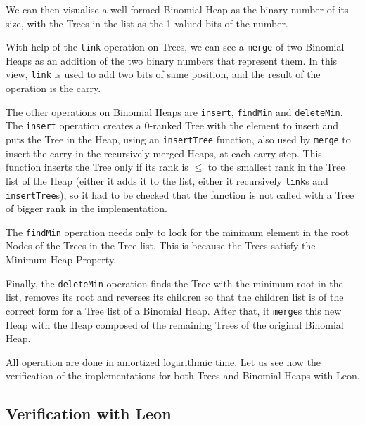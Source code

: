We can then visualise a well-formed Binomial Heap as the binary number of its size, 
with the Trees in the list as the 1-valued bits of the number.

With help of the \verb|link| operation on Trees, 
we can see a \verb|merge| of two Binomial Heaps 
as an addition of the two binary numbers that represent them.
In this view, \verb|link| is used to add two bits of same position,
and the result of the operation is the carry.

The other operations on Binomial Heaps are \verb|insert|, \verb|findMin| and \verb|deleteMin|. 
The \verb|insert| operation creates a 0-ranked Tree with the element to insert 
and puts the Tree in the Heap, using an \verb|insertTree| function, 
also used by \verb|merge| to insert the carry in the recursively merged Heaps,
at each carry step.
This function inserts the Tree only if its rank is $\leq$ to the smallest rank in the Tree list of the Heap 
(either it adds it to the list, either it recursively \verb|link|s and \verb|insertTree|s),
so it had to be checked that the function is not called with a Tree of bigger rank in the implementation.

The \verb|findMin| operation needs only to look for the minimum element 
in the root Nodes of the Trees in the Tree list.
This is because the Trees satisfy the Minimum Heap Property.

Finally, the \verb|deleteMin| operation finds the Tree with the minimum root in the list,
removes its root 
and reverses its children so that the children list is of the correct form for a Tree list of a Binomial Heap.
After that, it \verb|merge|s this new Heap with the Heap composed of 
the remaining Trees of the original Binomial Heap.

All operation are done in amortized logarithmic time.
Let us see now the verification of the implementations 
for both Trees and Binomial Heaps with Leon.

\subsection{Verification with Leon}
